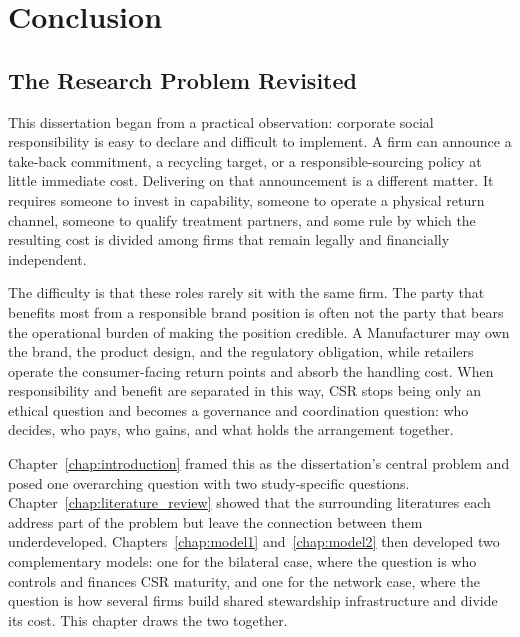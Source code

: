 \chapter{Conclusion}
\label{chap:conclusion}

\section{The Research Problem Revisited}
\label{sec:ch5_problem}

This dissertation began from a practical observation: corporate social responsibility is easy to declare and difficult to implement. A firm can announce a take-back commitment, a recycling target, or a responsible-sourcing policy at little immediate cost. Delivering on that announcement is a different matter. It requires someone to invest in capability, someone to operate a physical return channel, someone to qualify treatment partners, and some rule by which the resulting cost is divided among firms that remain legally and financially independent.

The difficulty is that these roles rarely sit with the same firm. The party that benefits most from a responsible brand position is often not the party that bears the operational burden of making the position credible. A Manufacturer may own the brand, the product design, and the regulatory obligation, while retailers operate the consumer-facing return points and absorb the handling cost. When responsibility and benefit are separated in this way, CSR stops being only an ethical question and becomes a governance and coordination question: who decides, who pays, who gains, and what holds the arrangement together.

Chapter~\ref{chap:introduction} framed this as the dissertation's central problem and posed one overarching question with two study-specific questions. Chapter~\ref{chap:literature_review} showed that the surrounding literatures each address part of the problem but leave the connection between them underdeveloped. Chapters~\ref{chap:model1} and~\ref{chap:model2} then developed two complementary models: one for the bilateral case, where the question is who controls and finances CSR maturity, and one for the network case, where the question is how several firms build shared stewardship infrastructure and divide its cost. This chapter draws the two together.

